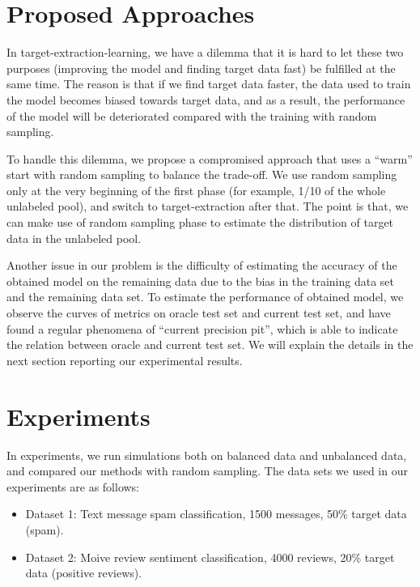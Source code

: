 \documentclass{deime}
\begin{document}
\section{Proposed Approaches}
\label{sec:method}

In target-extraction-learning, we have a dilemma that it is hard to
let these two purposes (improving the model and finding target data
fast) be fulfilled at the same time.  The reason is that if we find
target data faster, the data used to train the model becomes biased
towards target data, and as a result, the performance of the model
will be deteriorated compared with the training with random sampling.

To handle this dilemma, we propose a compromised approach that uses a
``warm'' start with random sampling to balance the trade-off.  We use
random sampling only at the very beginning of the first phase (for
example, 1/10 of the whole unlabeled pool), and switch to
target-extraction after that. The point is that, we can make use of
random sampling phase to estimate the distribution of target data in
the unlabeled pool.

Another issue in our problem is the difficulty of estimating the
accuracy of the obtained model on the remaining data due to the bias
in the training data set and the remaining data set.  To estimate the
performance of obtained model, we observe the curves of metrics on
oracle test set and current test set, and have found a regular
phenomena of ``current precision pit'', which is able to indicate the
relation between oracle and current test set.  We will explain the
details in the next section reporting our experimental results.

\section{Experiments}
\label{sec:experimtnt}

In experiments, we run simulations both on balanced data and
unbalanced data, and compared our methods with random sampling.  The
data sets we used in our experiments are as follows:

\begin{itemize}
\item Dataset 1: Text message spam classification, 1500 messages, 50\% target data (spam).
\item Dataset 2: Moive review sentiment classification, 4000 reviews, 20\% target data (positive reviews).
\end{itemize}
\end{document}
